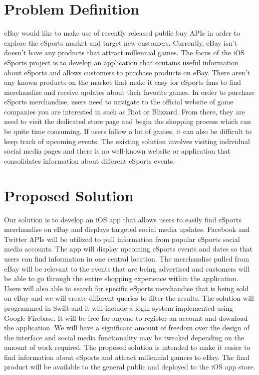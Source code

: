 \documentclass[onecolumn, draftclsnofoot,10pt, compsoc]{IEEEtran}
\begin{document}
\newpage
{}
\tableofcontents
\clearpage

\section{Problem Definition}
eBay would like to make use of recently released public buy APIs in order to explore the eSports market and target new customers. 
Currently, eBay isn’t doesn’t have any products that attract millennial games. 
The focus of the iOS eSports project is to develop an application that contains useful information about eSports and allows customers to purchase products on eBay. 
There aren’t any known products on the market that make it easy for eSports fans to find merchandise and receive updates about their favorite games. 
In order to purchase eSports merchandise, users need to navigate to the official website of game companies you are interested in such as Riot or Blizzard. 
From there, they are need to visit the dedicated store page and begin the shopping process which can be quite time consuming. 
If users follow a lot of games, it can also be difficult to keep track of upcoming events. 
The existing solution involves visiting individual social media pages and there is no well-known website or application that consolidates information about different eSports events.  

\section{Proposed Solution}
Our solution is to develop an iOS app that allows users to easily find eSports merchandise on eBay and displays targeted social media updates. 
Facebook and Twitter APIs will be utilized to pull information from popular eSports social media accounts. 
The app will display upcoming eSports events and dates so that users can find information in one central location. 
The merchandise pulled from eBay will be relevant to the events that are being advertised and customers will be able to go through the entire shopping experience within the application. 
Users will also able to search for specific eSports merchandise that is being sold on eBay and we will create different queries to filter the results. 
The solution will programmed in Swift and it will include a login system implemented using Google Firebase. 
It will be free for anyone to register an account and download the application. 
We will have a significant amount of freedom over the design of the interface and social media functionality may be tweaked depending on the amount of work required. 
The proposed solution is intended to make it easier to find information about eSports and attract millennial gamers to eBay. 
The final product will be available to the general public and deployed to the iOS app store. 
\end{document}
